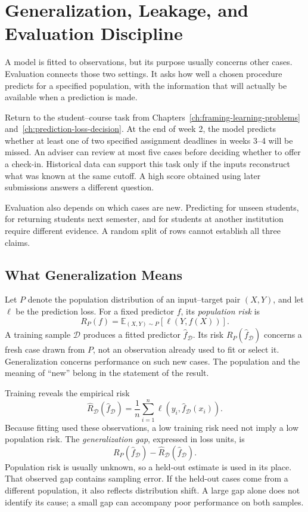 \begingroup
\raggedbottom
{}
\chapter[Generalization, Leakage, and Evaluation Discipline]{Generalization, Leakage, and\\Evaluation Discipline}
\label{ch:evaluation-discipline}

A model is fitted to observations, but its purpose usually concerns other cases. Evaluation connects those two settings. It asks how well a chosen procedure predicts for a specified population, with the information that will actually be available when a prediction is made.

Return to the student--course task from Chapters~\ref{ch:framing-learning-problems} and~\ref{ch:prediction-loss-decision}. At the end of week 2, the model predicts whether at least one of two specified assignment deadlines in weeks 3--4 will be missed. An adviser can review at most five cases before deciding whether to offer a check-in. Historical data can support this task only if the inputs reconstruct what was known at the same cutoff. A high score obtained using later submissions answers a different question.

Evaluation also depends on which cases are new. Predicting for unseen students, for returning students next semester, and for students at another institution require different evidence. A random split of rows cannot establish all three claims.

\section{What Generalization Means}

Let $P$ denote the population distribution of an input--target pair $(X,Y)$, and let $\ell$ be the prediction loss. For a fixed predictor $f$, its \emph{population risk} is
\[
R_P(f)=\mathbb{E}_{(X,Y)\sim P}[\ell(Y,f(X))].
\]
A training sample $\mathcal D$ produces a fitted predictor $\hat f_{\mathcal D}$. Its risk $R_P(\hat f_{\mathcal D})$ concerns a fresh case drawn from $P$, not an observation already used to fit or select it. Generalization concerns performance on such new cases. The population and the meaning of ``new'' belong in the statement of the result.

Training reveals the empirical risk
\[
\hat R_{\mathcal D}(\hat f_{\mathcal D})
=\frac1n\sum_{i=1}^n\ell(y_i,\hat f_{\mathcal D}(x_i)).
\]
Because fitting used these observations, a low training risk need not imply a low population risk. The \emph{generalization gap}, expressed in loss units, is
\[
R_P(\hat f_{\mathcal D})-\hat R_{\mathcal D}(\hat f_{\mathcal D}).
\]
Population risk is usually unknown, so a held-out estimate is used in its place. That observed gap contains sampling error. If the held-out cases come from a different population, it also reflects distribution shift. A large gap alone does not identify its cause; a small gap can accompany poor performance on both samples.

